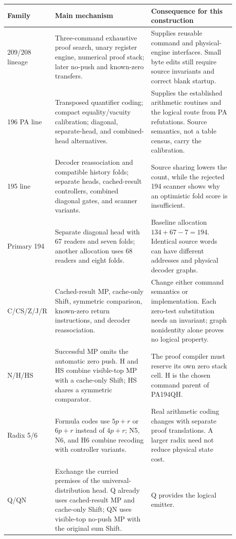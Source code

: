 \documentclass[11pt,letterpaper]{article}
\begin{document}
\begin{longtable}{@{}p{0.16\linewidth}p{0.41\linewidth}p{0.36\linewidth}@{}}
\toprule
Family & Main mechanism & Consequence for this construction \\
\midrule\endhead
209/208 lineage & Three-command exhaustive proof search, unary register
engine, numerical proof stack; later no-push and known-zero transfers. &
Supplies reusable command and physical-engine interfaces. Small byte edits
still require source invariants and correct blank startup. \\
196 PA line & Transposed quantifier coding; compact equality/vacuity
calibration; diagonal, separate-head, and combined-head alternatives. &
Supplies the established arithmetic routines and the logical route from
PA refutations. Source semantics, not a table census, carry the calibration. \\
195 line & Decoder reassociation and compatible history folds; separate
heads, cached-result controllers, combined diagonal gates, and scanner
variants. & Source sharing lowers the count, while the rejected 194 scanner
shows why an optimistic fold score is insufficient. \\
Primary 194 & Separate diagonal head with 67 readers and seven folds;
another allocation uses 68 readers and eight folds. & Baseline allocation
$134+67-7=194$. Identical source words can have different addresses and
physical decoder graphs. \\
C/CS/Z/J/R & Cached-result MP, cache-only Shift, symmetric comparison,
known-zero return instructions, and decoder reassociation. & Change either
command semantics or implementation. Each zero-test substitution needs
an invariant; graph nonidentity alone proves no logical property. \\
N/H/HS & Successful MP omits the automatic zero push. H and HS combine
visible-top MP with a cache-only Shift; HS shares a symmetric comparator. &
The proof compiler must reserve its own zero stack cell. H is the chosen
command parent of PA194QH. \\
Radix 5/6 & Formula codes use $5p+r$ or $6p+r$ instead of $4p+r$; N5, N6,
and H6 combine recoding with controller variants. & Real arithmetic coding
changes with separate proof translations. A larger radix need not reduce
physical state cost. \\
Q/QN & Exchange the curried premises of the universal-distribution head.
Q already uses cached-result MP and cache-only Shift; QN uses visible-top
no-push MP with the original sum Shift. & Q provides the logical emitter.

\end{longtable}
\end{document}
